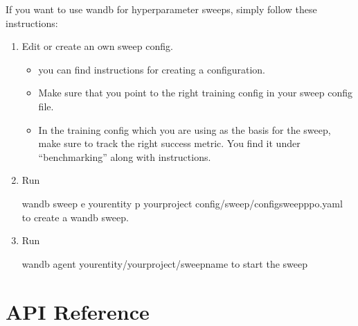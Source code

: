 \documentclass[letterpaper,10pt,english]{sphinxmanual}
\begin{document}
\sphinxAtStartPar
If you want to use wandb for hyperparameter sweeps, simply follow these instructions:
\begin{enumerate}
%
\item {} 
\sphinxAtStartPar
Edit  or create an own sweep config.
\begin{itemize}
\item {} 
\sphinxAtStartPar
{} you can find instructions for creating a configuration.

\item {} 
\sphinxAtStartPar
Make sure that you point to the right training config in your sweep config file.

\item {} 
\sphinxAtStartPar
In the training config which you are using as the basis for the sweep, make sure to track the right success metric. You find it under “benchmarking” along with instructions.

\end{itemize}

\item {} 
\sphinxAtStartPar
Run

\begin{sphinxVerbatim}[commandchars=\\\{\}]
wandb sweep \PYGZhy{}e your\PYGZus{}entity \PYGZhy{}p your\PYGZus{}project config/sweep/config\PYGZus{}sweep\PYGZus{}ppo.yaml to create a wandb sweep.
\end{sphinxVerbatim}

\item {} 
\sphinxAtStartPar
Run

\begin{sphinxVerbatim}[commandchars=\\\{\}]
wandb agent your\PYGZus{}entity/your\PYGZus{}project/sweep\PYGZus{}name to start the sweep
\end{sphinxVerbatim}

\end{enumerate}


\section{API Reference}
\label{\detokenize{api:api-reference}}\label{\detokenize{api::doc}}
\end{document}

